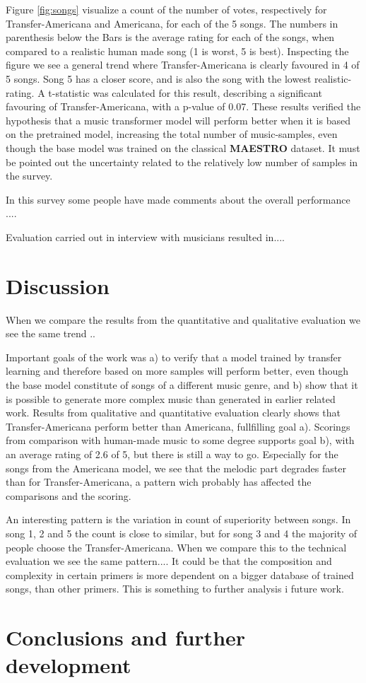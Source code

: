 \documentclass{IEEEtran}
\begin{document}
        Figure \ref{fig:songs} visualize a count of the number of votes, respectively for Transfer-Americana
        and Americana, for each of the 5 songs. The numbers in parenthesis below the Bars
        is the average rating for each of the songs, when compared to a realistic human made
        song (1 is worst, 5 is best). Inspecting the figure we see a general trend where Transfer-Americana is
        clearly favoured in 4 of 5 songs. Song 5 has a closer score, and is also the song with the lowest 
        realistic-rating. A t-statistic was calculated for this result, describing a significant favouring of 
        Transfer-Americana, with a p-value of 0.07. These results verified the hypothesis that a music transformer model will perform better when it is based on the pretrained model, increasing the total number of music-samples, even though the base model was trained on the classical \textbf{MAESTRO} dataset. It must be pointed out the uncertainty related to the relatively low number of samples in the survey. 
        
        In this survey some people have made comments about the overall performance ....

        Evaluation carried out in interview with musicians resulted in.... %

    \section{Discussion}
    When we compare the results from the quantitative and qualitative evaluation we see the same trend ..

    Important goals of the work was a) to verify that a model trained by transfer learning and therefore based on more samples will perform better, even though the base model constitute of songs of a different music genre, and b) show that it is possible to generate more complex music than generated in earlier related work. Results from qualitative and quantitative evaluation clearly shows that Transfer-Americana perform better than Americana, fullfilling goal a). Scorings from comparison with human-made music to some degree supports goal b), with an average rating of 2.6 of 5, but there is still a way to go. Especially for the songs from the Americana model, we see that the melodic part degrades faster than for Transfer-Americana, a pattern wich probably has affected the comparisons and the scoring.

    An interesting pattern is the variation in count of superiority between songs. In song 1, 2 and 5 the count is close to similar, but for song 3 and 4 the majority of people choose the Transfer-Americana. When we compare this to the technical evaluation we see the same pattern.... It could be that the composition and complexity in certain primers is more dependent on a bigger database of trained songs, than other primers. This is something to further analysis i future work.

    
    \section{Conclusions and further development}

    \vfill
    \pagebreak
    \printbibliography
\end{document}
